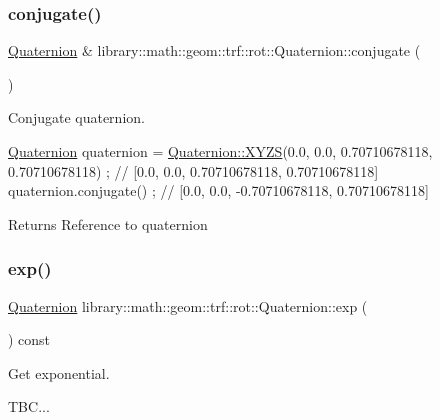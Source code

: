 \subsubsection{\texorpdfstring{conjugate()}{conjugate()}}
{\footnotesize\ttfamily \hyperlink{classlibrary_1_1math_1_1geom_1_1trf_1_1rot_1_1_quaternion}{Quaternion} \& library\+::math\+::geom\+::trf\+::rot\+::\+Quaternion\+::conjugate (\begin{DoxyParamCaption}{ }\end{DoxyParamCaption})}



Conjugate quaternion. 


\begin{DoxyCode}
\hyperlink{classlibrary_1_1math_1_1geom_1_1trf_1_1rot_1_1_quaternion_aa7f459a08f5af38b9f7676a6bf36a21c}{Quaternion} quaternion = \hyperlink{classlibrary_1_1math_1_1geom_1_1trf_1_1rot_1_1_quaternion_afff9523c7dcbfbbc521736121e62ad41}{Quaternion::XYZS}(0.0, 0.0, 0.70710678118, 0.70710678118) 
      ; \textcolor{comment}{// [0.0, 0.0, 0.70710678118, 0.70710678118]}
quaternion.conjugate() ; \textcolor{comment}{// [0.0, 0.0, -0.70710678118, 0.70710678118]}
\end{DoxyCode}


\begin{DoxyReturn}{Returns}
Reference to quaternion 
\end{DoxyReturn}
\mbox{\label{classlibrary_1_1math_1_1geom_1_1trf_1_1rot_1_1_quaternion_a171373818023a1c013891d4297360542}} 
\subsubsection{\texorpdfstring{exp()}{exp()}}
{\footnotesize\ttfamily \hyperlink{classlibrary_1_1math_1_1geom_1_1trf_1_1rot_1_1_quaternion}{Quaternion} library\+::math\+::geom\+::trf\+::rot\+::\+Quaternion\+::exp (\begin{DoxyParamCaption}{ }\end{DoxyParamCaption}) const}



Get exponential. 


\begin{DoxyCode}
TBC...
\end{DoxyCode}


